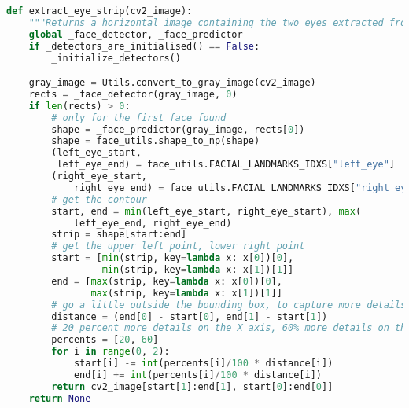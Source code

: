 \begin{lstlisting}[language=Python, caption=Extragerea ``bandei oculare'' în Python3]
def extract_eye_strip(cv2_image):
    """Returns a horizontal image containing the two eyes extracted from the image"""
    global _face_detector, _face_predictor
    if _detectors_are_initialised() == False:
        _initialize_detectors()

    gray_image = Utils.convert_to_gray_image(cv2_image)
    rects = _face_detector(gray_image, 0)
    if len(rects) > 0:
        # only for the first face found
        shape = _face_predictor(gray_image, rects[0])
        shape = face_utils.shape_to_np(shape)
        (left_eye_start,
         left_eye_end) = face_utils.FACIAL_LANDMARKS_IDXS["left_eye"]
        (right_eye_start,
            right_eye_end) = face_utils.FACIAL_LANDMARKS_IDXS["right_eye"]
        # get the contour
        start, end = min(left_eye_start, right_eye_start), max(
            left_eye_end, right_eye_end)
        strip = shape[start:end]
        # get the upper left point, lower right point
        start = [min(strip, key=lambda x: x[0])[0],
                 min(strip, key=lambda x: x[1])[1]]
        end = [max(strip, key=lambda x: x[0])[0],
               max(strip, key=lambda x: x[1])[1]]
        # go a little outside the bounding box, to capture more details
        distance = (end[0] - start[0], end[1] - start[1])
        # 20 percent more details on the X axis, 60% more details on the Y axis
        percents = [20, 60]
        for i in range(0, 2):
            start[i] -= int(percents[i]/100 * distance[i])
            end[i] += int(percents[i]/100 * distance[i])
        return cv2_image[start[1]:end[1], start[0]:end[0]]
    return None

\end{lstlisting}